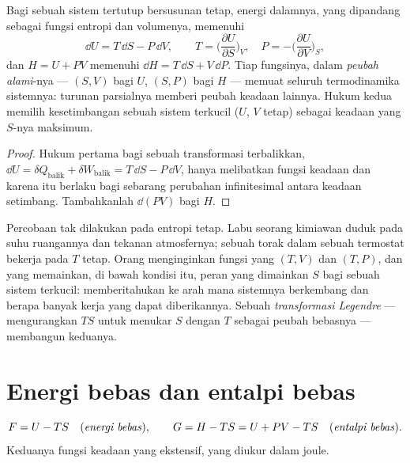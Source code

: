 \begin{proposition}\label{prop:b2:thermodynamic-potentials:identity}
Bagi sebuah sistem tertutup bersusunan tetap, energi dalamnya,
yang dipandang sebagai fungsi entropi dan volumenya, memenuhi
\[
\dd U = T\,\dd S - P\,\dd V, \qquad
T = \Big(\frac{\partial U}{\partial S}\Big)_V, \quad
P = -\Big(\frac{\partial U}{\partial V}\Big)_S ,
\]
dan  $H = U + PV$ memenuhi $\dd H = T\,\dd S + V\,\dd P$.
Tiap fungsinya, dalam \emph{peubah alami}-nya --- $(S,V)$ bagi $U$, $(S,P)$ bagi $H$ --- memuat seluruh
termodinamika sistemnya: turunan parsialnya memberi peubah
keadaan lainnya. Hukum kedua memilih kesetimbangan sebuah sistem
terkucil ($U$, $V$ tetap) sebagai keadaan yang $S$-nya maksimum.
\end{proposition}

\begin{proof}
Hukum pertama bagi sebuah transformasi terbalikkan, $\dd U = \delta Q_{\text{balik}}
+ \delta W_{\text{balik}} = T\,\dd S - P\,\dd V$, hanya melibatkan fungsi
keadaan dan karena itu berlaku bagi sebarang perubahan infinitesimal antara
keadaan setimbang. Tambahkanlah $\dd(PV)$ bagi $H$.
\end{proof}

\begin{remark}\label{rem:b2:thermodynamic-potentials:why}
Percobaan tak dilakukan pada entropi tetap. Labu seorang kimiawan duduk pada
suhu ruangannya dan tekanan atmosfernya; sebuah
torak dalam sebuah termostat bekerja pada $T$ tetap. Orang menginginkan fungsi yang
 $(T,V)$ dan $(T,P)$, dan yang memainkan, di bawah kondisi
itu, peran yang dimainkan $S$ bagi sebuah sistem terkucil: memberitahukan
ke arah mana sistemnya berkembang dan berapa banyak kerja yang dapat diberikannya. Sebuah
\emph{transformasi Legendre} --- mengurangkan $TS$ untuk menukar $S$ dengan $T$ sebagai
peubah bebasnya --- membangun keduanya.
\end{remark}

\section{Energi bebas dan entalpi bebas}

\begin{definition}\label{def:b2:thermodynamic-potentials:FG}
\[
F = U - TS \quad\text{(\emph{energi bebas}\index{energi bebas})}, \qquad
G = H - TS = U + PV - TS \quad\text{(\emph{entalpi bebas}\index{entalpi bebas})}.
\]
Keduanya fungsi keadaan yang ekstensif, yang diukur dalam joule.
\end{definition}

